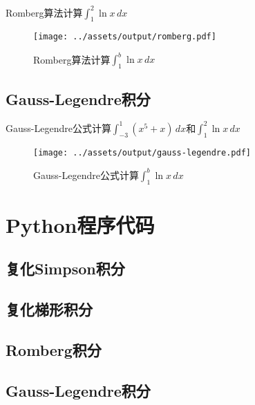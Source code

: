 \documentclass{nedsart}
\begin{document}
\begin{table}[H]
    \centering
    \caption{Romberg算法计算$\int_1^2 \ln{x} \,dx$}
    \label{tab:romberg}
\end{table}

\begin{figure}[H]
    \centering
    \texttt{[image: ../assets/output/romberg.pdf]}
    \caption{Romberg算法计算$\int_1^b \ln{x} \,dx$}
    \label{fig:romberg}
\end{figure}

\subsection{Gauss-Legendre积分}

\begin{table}[H]
    \centering
    \label{tab:gauss-legendre}
    \caption{Gauss-Legendre公式计算$\int_{-3}^1 (x^5+x) \,dx$和$\int_1^2 \ln{x} \,dx$}
\end{table}

\begin{figure}[H]
    \centering
    \texttt{[image: ../assets/output/gauss-legendre.pdf]}
    \caption{Gauss-Legendre公式计算$\int_1^b \ln{x} \,dx$}
    \label{fig:gauss-legendre}
\end{figure}

\section{Python程序代码}

\subsection{复化Simpson积分}

\subsection{复化梯形积分}

\subsection{Romberg积分}

\subsection{Gauss-Legendre积分}
\end{document}
